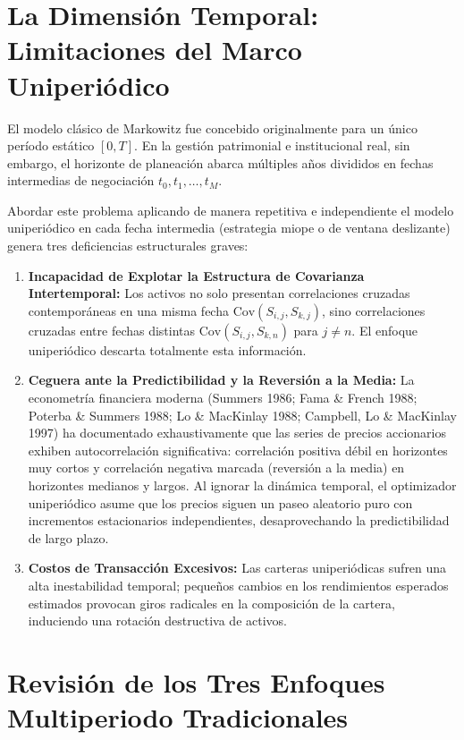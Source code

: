 \documentclass[11pt,a4paper]{report}
\numberwithin{equation}{chapter}
\begin{document}
\section{La Dimensión Temporal: Limitaciones del Marco Uniperiódico}

El modelo clásico de Markowitz fue concebido originalmente para un único período estático $[0, T]$. En la gestión patrimonial e institucional real, sin embargo, el horizonte de planeación abarca múltiples años divididos en fechas intermedias de negociación $t_0, t_1, \dots, t_M$. 

Abordar este problema aplicando de manera repetitiva e independiente el modelo uniperiódico en cada fecha intermedia (estrategia miope o de ventana deslizante) genera tres deficiencias estructurales graves:
\begin{enumerate}[leftmargin=2em]
    \item \textbf{Incapacidad de Explotar la Estructura de Covarianza Intertemporal:} Los activos no solo presentan correlaciones cruzadas contemporáneas en una misma fecha $\mathrm{Cov}(S_{i,j}, S_{k,j})$, sino correlaciones cruzadas entre fechas distintas $\mathrm{Cov}(S_{i,j}, S_{k,n})$ para $j \neq n$. El enfoque uniperiódico descarta totalmente esta información.
    \item \textbf{Ceguera ante la Predictibilidad y la Reversión a la Media:} La econometría financiera moderna (Summers 1986; Fama \& French 1988; Poterba \& Summers 1988; Lo \& MacKinlay 1988; Campbell, Lo \& MacKinlay 1997) ha documentado exhaustivamente que las series de precios accionarios exhiben autocorrelación significativa: correlación positiva débil en horizontes muy cortos y correlación negativa marcada (reversión a la media) en horizontes medianos y largos. Al ignorar la dinámica temporal, el optimizador uniperiódico asume que los precios siguen un paseo aleatorio puro con incrementos estacionarios independientes, desaprovechando la predictibilidad de largo plazo.
    \item \textbf{Costos de Transacción Excesivos:} Las carteras uniperiódicas sufren una alta inestabilidad temporal; pequeños cambios en los rendimientos esperados estimados provocan giros radicales en la composición de la cartera, induciendo una rotación destructiva de activos.
\end{enumerate}

\section{Revisión de los Tres Enfoques Multiperiodo Tradicionales}
\end{document}
